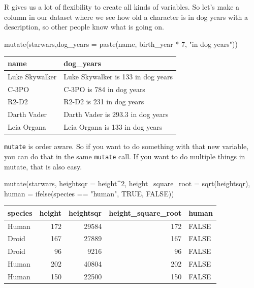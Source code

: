 \documentclass[
  letterpaper,
  DIV=11,
  numbers=noendperiod,
  oneside]{scrreprt}
\newenvironment{Shaded}{\begin{snugshade}}{\end{snugshade}}
\newcommand{\AttributeTok}[1]{\textcolor[rgb]{0.40,0.45,0.13}{#1}}
\newcommand{\ConstantTok}[1]{\textcolor[rgb]{0.56,0.35,0.01}{#1}}
\newcommand{\DecValTok}[1]{\textcolor[rgb]{0.68,0.00,0.00}{#1}}
\newcommand{\FunctionTok}[1]{\textcolor[rgb]{0.28,0.35,0.67}{#1}}
\newcommand{\NormalTok}[1]{\textcolor[rgb]{0.00,0.23,0.31}{#1}}
\newcommand{\SpecialCharTok}[1]{\textcolor[rgb]{0.37,0.37,0.37}{#1}}
\newcommand{\StringTok}[1]{\textcolor[rgb]{0.13,0.47,0.30}{#1}}
\begin{document}
R gives us a lot of flexibility to create all kinds of variables. So
let's make a column in our dataset where we see how old a character is
in dog years with a description, so other people know what is going on.

\begin{Shaded}
\begin{Highlighting}[]
\FunctionTok{mutate}\NormalTok{(starwars,}\AttributeTok{dog\_years =} \FunctionTok{paste}\NormalTok{(name, birth\_year }\SpecialCharTok{*} \DecValTok{7}\NormalTok{, }\StringTok{"in dog years"}\NormalTok{)) }
\end{Highlighting}
\end{Shaded}

\begin{table}
\centering
\begin{tabular}[t]{l|l}
\hline
name & dog\_years\\
\hline
Luke Skywalker & Luke Skywalker is 133 in dog years\\
\hline
C-3PO & C-3PO is 784 in dog years\\
\hline
R2-D2 & R2-D2 is 231 in dog years\\
\hline
Darth Vader & Darth Vader is 293.3 in dog years\\
\hline
Leia Organa & Leia Organa is 133 in dog years\\
\hline
\end{tabular}
\end{table}

\texttt{mutate} is order aware. So if you want to do something with that
new variable, you can do that in the same \texttt{mutate} call. If you
want to do multiple things in mutate, that is also easy.

\begin{Shaded}
\begin{Highlighting}[]
\FunctionTok{mutate}\NormalTok{(starwars, }\AttributeTok{heightsqr =}\NormalTok{ height}\SpecialCharTok{\^{}}\DecValTok{2}\NormalTok{,}
                 \AttributeTok{height\_square\_root =} \FunctionTok{sqrt}\NormalTok{(heightsqr),}
                 \AttributeTok{human =} \FunctionTok{ifelse}\NormalTok{(species }\SpecialCharTok{==} \StringTok{"human"}\NormalTok{, }\ConstantTok{TRUE}\NormalTok{, }\ConstantTok{FALSE}\NormalTok{))}
\end{Highlighting}
\end{Shaded}

\begin{tabular}{l|r|r|r|l}
\hline
species & height & heightsqr & height\_square\_root & human\\
\hline
Human & 172 & 29584 & 172 & FALSE\\
\hline
Droid & 167 & 27889 & 167 & FALSE\\
\hline
Droid & 96 & 9216 & 96 & FALSE\\
\hline
Human & 202 & 40804 & 202 & FALSE\\
\hline
Human & 150 & 22500 & 150 & FALSE\\
\hline
\end{tabular}
\end{document}
